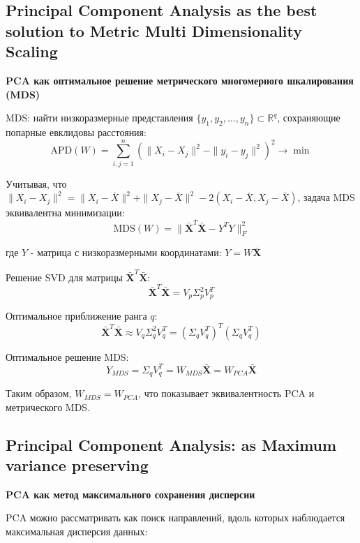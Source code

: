 \documentclass[a4paper,12pt]{article}
\begin{document}
\subsection{Principal Component Analysis as the best solution to Metric Multi Dimensionality Scaling}

\textbf{PCA как оптимальное решение метрического многомерного шкалирования (MDS)}

MDS: найти низкоразмерные представления $\{y_1, y_2, \ldots, y_n\} \subset \mathbb{R}^q$, сохраняющие попарные евклидовы расстояния:
$$\text{APD}(W) = \sum_{i,j=1}^n \left(\|X_i - X_j\|^2 - \|y_i - y_j\|^2\right)^2 \rightarrow \min$$

Учитывая, что $\|X_i - X_j\|^2 = \|X_i - \bar{X}\|^2 + \|X_j - \bar{X}\|^2 - 2(X_i - \bar{X}, X_j - \bar{X})$, задача MDS эквивалентна минимизации:
$$\text{MDS}(W) = \|\bar{\mathbf{X}}^T\bar{\mathbf{X}} - Y^TY\|_F^2$$

где $Y$ - матрица с низкоразмерными координатами: $Y = W\bar{\mathbf{X}}$

Решение SVD для матрицы $\bar{\mathbf{X}}^T\bar{\mathbf{X}}$:
$$\bar{\mathbf{X}}^T\bar{\mathbf{X}} = V_p \Sigma_p^2 V_p^T$$

Оптимальное приближение ранга $q$:
$$\bar{\mathbf{X}}^T\bar{\mathbf{X}} \approx V_q \Sigma_q^2 V_q^T = (\Sigma_q V_q^T)^T(\Sigma_q V_q^T)$$

Оптимальное решение MDS:
$$Y_{MDS} = \Sigma_q V_q^T = W_{MDS}\bar{\mathbf{X}} = W_{PCA}\bar{\mathbf{X}}$$

Таким образом, $W_{MDS} = W_{PCA}$, что показывает эквивалентность PCA и метрического MDS.

\subsection{Principal Component Analysis: as Maximum variance preserving}

\textbf{PCA как метод максимального сохранения дисперсии}

PCA можно рассматривать как поиск направлений, вдоль которых наблюдается максимальная дисперсия данных:
\end{document}

